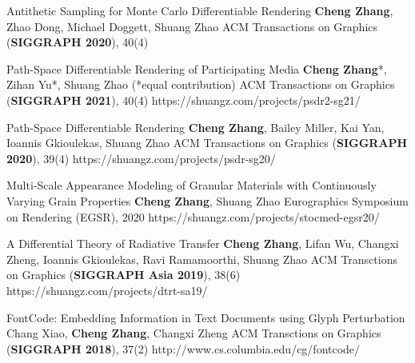 
\begin{cvpublications}{}

    \cvpublication
	{Antithetic Sampling for Monte Carlo Differentiable Rendering}
	{\textbf{Cheng Zhang}, Zhao Dong, Michael Doggett, Shuang Zhao}
	{ACM Transactions on Graphics (\textbf{SIGGRAPH 2020}), 40(4)}
	{}


    \cvpublication
	{Path-Space Differentiable Rendering of Participating Media}
	{\textbf{Cheng Zhang}*, Zihan Yu*, Shuang Zhao (*equal contribution)}
	{ACM Transactions on Graphics (\textbf{SIGGRAPH 2021}), 40(4)}
	{https://shuangz.com/projects/psdr2-sg21/}


    \cvpublication
	{Path-Space Differentiable Rendering}
	{\textbf{Cheng Zhang}, Bailey Miller, Kai Yan, Ioannis Gkioulekas, Shuang Zhao}
	{ACM Transactions on Graphics (\textbf{SIGGRAPH 2020}), 39(4)}
	{https://shuangz.com/projects/psdr-sg20/}

    \cvpublication
	{Multi-Scale Appearance Modeling of Granular Materials with Continuously Varying Grain Properties}
	{\textbf{Cheng Zhang}, Shuang Zhao}
	{Eurographics Symposium on Rendering (EGSR), 2020}
	{https://shuangz.com/projects/stocmed-egsr20/}

    \cvpublication
	{A Differential Theory of Radiative Transfer}
	{\textbf{Cheng Zhang}, Lifan Wu, Changxi Zheng, Ioannis Gkioulekas, Ravi Ramamoorthi, Shuang Zhao}
	{ACM Transctions on Graphics (\textbf{SIGGRAPH Asia 2019}), 38(6)}
	{https://shuangz.com/projects/dtrt-sa19/}

	\cvpublication
	{FontCode: Embedding Information in Text Documents using Glyph Perturbation}
	{Chang Xiao, \textbf{Cheng Zhang}, Changxi Zheng}
	{ACM Transctions on Graphics (\textbf{SIGGRAPH 2018}), 37(2)}
	{http://www.cs.columbia.edu/cg/fontcode/}

\end{cvpublications}
